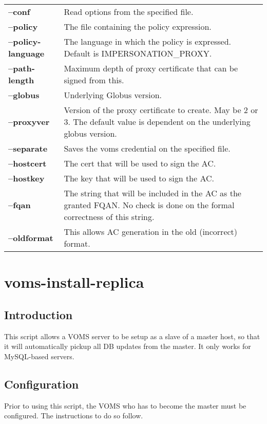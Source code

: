 \documentclass[a4paper]{book}
\begin{document}
\begin{longtable}{lp{3in}}
\textbf{--conf}         & Read options from the specified file.\\
\textbf{--policy}       & The file containing the policy expression.\\
\textbf{--policy-language} & The language in which the policy is
                             expressed.  Default is
                             IMPERSONATION\_PROXY.\\
\textbf{--path-length}  & Maximum depth of proxy certificate that can
                          be signed from this.\\
\textbf{--globus}       & Underlying Globus version.\\
\textbf{--proxyver}     & Version of the proxy certificate to create.
                          May be 2 or 3.  The default value is
                          dependent on the underlying globus version.\\
\textbf{--separate}     & Saves the voms credential on the specified
                          file.\\ 
\textbf{--hostcert}     & The cert that will be used to sign the AC.\\
\textbf{--hostkey}      & The key that will be used to sign the AC.\\
\textbf{--fqan}         & The string that will be included in the AC
                          as the granted FQAN.  No check is done on
                          the formal correctness of this string.\\
\textbf{--oldformat}    & This allows AC generation in the old (incorrect) format.\\
\end{longtable}

\chapter{voms-install-replica}
\section{Introduction}
This script allows a VOMS server to be setup as a slave of a master
host, so that it will automatically pickup all DB updates from the
master.  It only works for MySQL-based servers.

\section{Configuration}
Prior to using this script, the VOMS who has to become the master must
be configured.  The instructions to do so follow.
\end{document}
